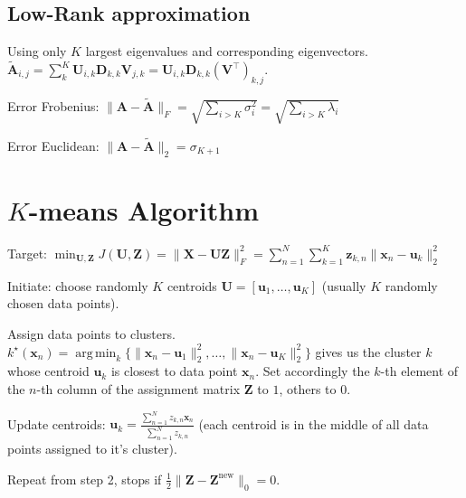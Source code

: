 \documentclass[a4paper, 11pt, landscape]{article}
\DeclareMathOperator*{\argmin}{arg\,min}
\begin{document}
\begin{multicols*}{3}
\subsection{Low-Rank approximation}
Using only $K$ largest eigenvalues and corresponding eigenvectors. $\tilde{\mathbf{A}}_{i, j} = \sum_{k}^K \mathbf{U}_{i, k} \mathbf{D}_{k,k} \mathbf{V}_{j, k} = \mathbf{U}_{i, k} \mathbf{D}_{k,k} (\mathbf{V}^\top)_{k, j}$.
\begin{compactdesc}
	\item[Error Frobenius:] $\|\mathbf{A} - \tilde{\mathbf{A}}\|_F = \sqrt{\sum_{i > K} \sigma_i^2} = \sqrt{\sum_{i > K} \lambda_i}$
	\item[Error Euclidean:] $\|\mathbf{A} - \tilde{\mathbf{A}}\|_2 = \sigma_{K+1}$
\end{compactdesc}

\section{$K$-means Algorithm}
\begin{inparadesc}
	\item[\color{red}Target:] $\min_{\mathbf{U}, \mathbf{Z}} J(\mathbf{U}, \mathbf{Z}) = \|\mathbf{X} - \mathbf{U} \mathbf{Z}\|_F^2 = \sum_{n=1}^N \sum_{k=1}^K \mathbf{z}_{k,n} \|\mathbf{x}_n - \mathbf{u}_k\|_2^2$
\end{inparadesc}
\begin{inparaenum}
	\item Initiate: choose randomly $K$ centroids $\mathbf{U} = [\mathbf{u}_1, \ldots, \mathbf{u}_K]$ (usually $K$ randomly chosen data points).
	\item Assign data points to clusters. $k^\star(\mathbf{x}_n) = \argmin_k \{ \|\mathbf{x}_n - \mathbf{u}_1\|_2^2, \ldots, \|\mathbf{x}_n - \mathbf{u}_K\|_2^2 \}$ gives us the cluster $k$ whose centroid $\mathbf{u}_k$ is closest to data point $\mathbf{x}_n$. Set accordingly the $k$-th element of the $n$-th column of the assignment matrix $\mathbf{Z}$ to $1$, others to $0$.
	\item Update centroids: $\mathbf{u}_k = \frac{\sum_{n=1}^N z_{k,n} \mathbf{x}_n}{\sum_{n=1}^N z_{k,n}}$ (each centroid is in the middle of all data points assigned to it's cluster).
	\item Repeat from step 2, stops if $\frac{1}{2} \|\mathbf{Z} - \mathbf{Z}^\text{new}\|_0 = 0$.
\end{inparaenum}


\end{multicols*}
\end{document}
